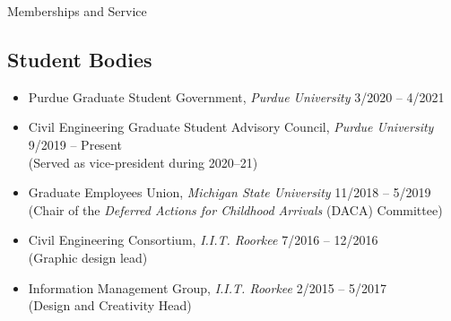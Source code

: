 \documentclass{CV} %
\begin{document}
\begin{rSection}{Memberships and Service}
    \subsection*{Student Bodies}
    \begin{itemize}
        \item Purdue Graduate Student Government, \textit{Purdue University} \hfill 3/2020 – 4/2021
        \item Civil Engineering Graduate Student Advisory Council, \textit{Purdue University} \hfill 9/2019 – Present \\
        (Served as vice-president during 2020–21)
        \item Graduate Employees Union, \textit{Michigan State University} \hfill 11/2018 – 5/2019 \\
        (Chair of the \emph{Deferred Actions for Childhood Arrivals} (DACA) Committee)
        \item Civil Engineering Consortium, \textit{I.I.T. Roorkee} \hfill 7/2016 – 12/2016
        \\ (Graphic design lead)
        \item Information Management Group, \textit{I.I.T. Roorkee} \hfill 2/2015 – 5/2017
        \\ (Design and Creativity Head)
    \end{itemize}
\end{rSection}
\end{document}
